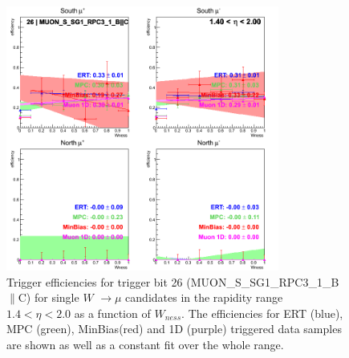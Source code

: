 \begin{figure}[h!]

  \centering

  \includegraphics[width=0.8\textwidth]{./figures/run13_trigeffisn_eta1_trig26_lin.png}
  \caption{\label{fig:run13_trigeffisn_eta1_nper0_trig26_lin} Trigger efficiencies for trigger bit 26 (MUON\_S\_SG1\_RPC3\_1\_B$\|$C) for single $W$ $\rightarrow \mu$ candidates in the rapidity range $ 1.4 < \eta < 2.0$ as a function of $W_{ness}$. The efficiencies for ERT (blue), MPC (green), MinBias(red) and 1D (purple) triggered data samples are shown as well as a constant fit over the whole range.}

\end{figure}
\clearpage
